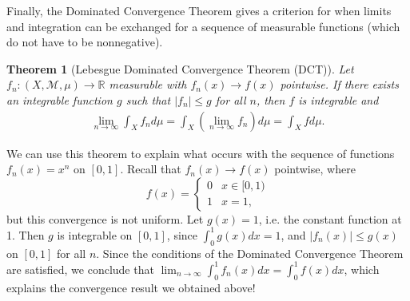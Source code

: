 \documentclass[12pt]{amsart}         %
\newtheorem{theorem}{Theorem}[section]
\theoremstyle{remark}
\newcommand{\R}{\mathbb{R}}
\begin{document}
Finally, the Dominated Convergence Theorem gives a criterion for when limits and integration can be exchanged for a sequence of measurable functions (which do not have to be nonnegative).

\begin{theorem}[Lebesgue Dominated Convergence Theorem (DCT)]
Let $f_n: (X,\mathcal{M},\mu) \rightarrow \R$ measurable with $f_n(x) \rightarrow f(x)$ pointwise. If there exists an integrable function $g$ such that $|f_n| \leq g$ for all $n$, then $f$ is integrable and
\begin{align*}
\lim_{n\rightarrow \infty} \int_X f_n d\mu = \int_X \left(\lim_{n\rightarrow \infty} f_n\right) d\mu = \int_X f d\mu.
\end{align*}
\end{theorem}

We can use this theorem to explain what occurs with the sequence of functions $f_n(x) = x^n$ on $[0,1]$. Recall that $f_n(x) \rightarrow f(x)$ pointwise, where 
\[
f(x) = \begin{cases}
0 & x \in [0, 1) \\
1 & x = 1,
\end{cases}
\]
but this convergence is not uniform. Let $g(x) = 1$, i.e. the constant function at 1. Then $g$ is integrable on $[0,1]$, since $\int_0^1 g(x) dx = 1$, and $|f_n(x)| \leq g(x)$ on $[0,1]$ for all $n$. Since the conditions of the Dominated Convergence Theorem are satisfied, we conclude that $\lim_{n\rightarrow \infty} \int_0^1 f_n(x) dx = \int_0^1 f(x) dx$, which explains the convergence result we obtained above!
\end{document}
